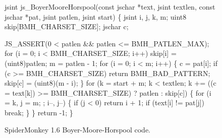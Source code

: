 \documentclass[conference]{IEEEtran}
\begin{document}
\begin{figure}
{\scriptsize
\begin{code}
jsint
js\_BoyerMooreHorspool(const jschar *text, jsint textlen,
                      const jschar *pat, jsint patlen,
                      jsint start)
\{
  jsint i, j, k, m;
  uint8 skip[BMH\_CHARSET\_SIZE];
  jschar c;

  JS\_ASSERT(0 < patlen && patlen <= BMH\_PATLEN\_MAX);
  for (i = 0; i < BMH\_CHARSET\_SIZE; i++)
    skip[i] = (uint8)patlen;
  m = patlen - 1;
  for (i = 0; i < m; i++) \{
    c = pat[i];
    if (c >= BMH\_CHARSET\_SIZE)
      return BMH\_BAD\_PATTERN;
    skip[c] = (uint8)(m - i);
  \}
  for (k = start + m;
       k < textlen;
       k += ((c = text[k]) >= BMH\_CHARSET\_SIZE) ? 
             patlen : skip[c]) \{
    for (i = k, j = m; ; i--, j--) \{
      if (j < 0)
	return i + 1;
      if (text[i] != pat[j])
	break;
    \}
  \}
  return -1;
\}
\end{code}
}
\caption{SpiderMonkey 1.6 Boyer-Moore-Horspool code.}
\label{fig:bmh}
\end{figure}
\end{document}
